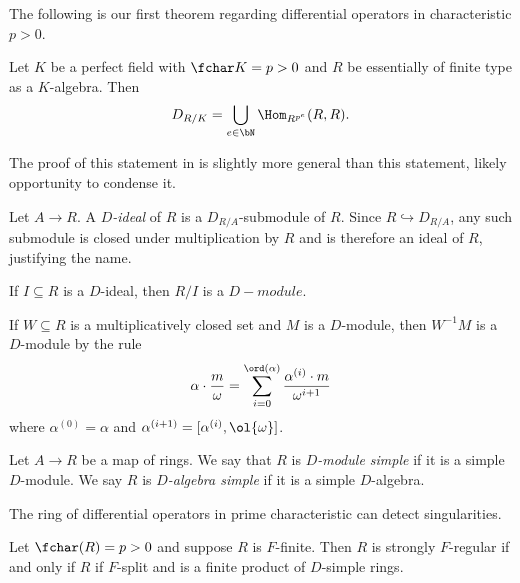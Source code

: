 The following is our first theorem regarding differential operators in characteristic $p > 0$.

\begin{thm}\label{thm:perfect-field-diff-op}
	Let $K$ be a perfect field with $\fchar K = p > 0$ and $R$ be essentially of finite type as a $K$-algebra. Then
	\begin{align*}
		D_{R/K} = \bigcup_{e\in \bN} \Hom_{R^{p^e}}(R,R).
	\end{align*}
\end{thm}
\begin{prf}
	The proof of this statement in \cite{amon92} is slightly more general than this statement, likely opportunity to condense it.
\end{prf}

\begin{defn}\label{defn:D-ideal}
	Let $A\to R$. A \emph{$D$-ideal} of $R$ is a $D_{R/A}$-submodule of $R$. Since $R \hookrightarrow D_{R/A}$, any such submodule is closed under multiplication by $R$ and is therefore an ideal of $R$, justifying the name.
\end{defn}

\begin{example}\label{ex:quotient-is-d-mod}
	If $I \subseteq R$ is a $D$-ideal, then $R/I$ is a $D-module$.
\end{example}

\begin{prop}\label{prop:localization-of-D-mod}
	If $W \subseteq R$ is a multiplicatively closed set and $M$ is a $D$-module, then $W^{-1}M$ is a $D$-module by the rule
	\begin{align*}
		\alpha\cdot \frac{m}{\omega} = \sum_{i = 0}^{\ord(\alpha)} \frac{\alpha^{(i)}\cdot m}{\omega^{i+1}}
	\end{align*}
	where $\alpha^{(0)} = \alpha$ and $\alpha^{(i+1)} = [\alpha^{(i)}, \ol{\omega}]$.
\end{prop}

\begin{defn}\label{defn:D-module-simple}
	Let $A\to R$ be a map of rings. We say that $R$ is \emph{$D$-module simple} if it is a simple $D$-module. We say $R$ is \emph{$D$-algebra simple} if it is a simple $D$-algebra.
\end{defn}

The ring of differential operators in prime characteristic can detect singularities. 

\begin{thm}\label{thm:strongly-F-regular-rings-D-simple}
	Let $\fchar(R) = p > 0$ and suppose $R$ is $F$-finite. Then $R$ is strongly $F$-regular if and only if $R$ if $F$-split and is a finite product of $D$-simple rings.
\end{thm}
\newpage
\printbibliography

